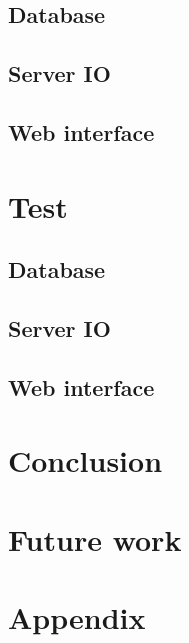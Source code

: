   \section{Database}
  \section{Server IO}
  \section{Web interface}

\chapter{Test}
  \section{Database}
  \section{Server IO}
  \section{Web interface}

\chapter{Conclusion}
\chapter{Future work}

\chapter*{Appendix}


